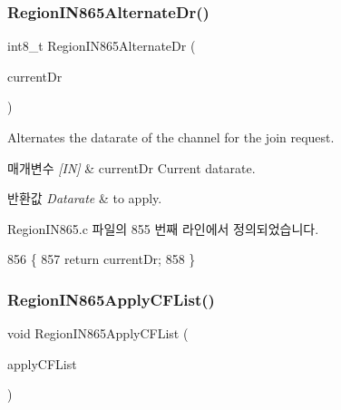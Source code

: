 \subsubsection{\texorpdfstring{Region\+I\+N865\+Alternate\+Dr()}{RegionIN865AlternateDr()}}
{\footnotesize\ttfamily int8\+\_\+t Region\+I\+N865\+Alternate\+Dr (\begin{DoxyParamCaption}\item[{int8\+\_\+t}]{current\+Dr }\end{DoxyParamCaption})}



Alternates the datarate of the channel for the join request. 


\begin{DoxyParams}{매개변수}
{\em \mbox{[}\+I\+N\mbox{]}} & current\+Dr Current datarate.\\
\hline
\end{DoxyParams}

\begin{DoxyRetVals}{반환값}
{\em Datarate} & to apply. \\
\hline
\end{DoxyRetVals}


Region\+I\+N865.\+c 파일의 855 번째 라인에서 정의되었습니다.


\begin{DoxyCode}
856 \{
857     \textcolor{keywordflow}{return} currentDr;
858 \}
\end{DoxyCode}
\mbox{\label{group___r_e_g_i_o_n_i_n865_ga4b896d2b7f6cd70d1c11b9f38ee06acf}} 
\subsubsection{\texorpdfstring{Region\+I\+N865\+Apply\+C\+F\+List()}{RegionIN865ApplyCFList()}}
{\footnotesize\ttfamily void Region\+I\+N865\+Apply\+C\+F\+List (\begin{DoxyParamCaption}\item[{\mbox{\hyperlink{group___r_e_g_i_o_n_ga71588e9ad07e34b78fa91d51881fd3c6}{Apply\+C\+F\+List\+Params\+\_\+t}} $\ast$}]{apply\+C\+F\+List }\end{DoxyParamCaption})}



